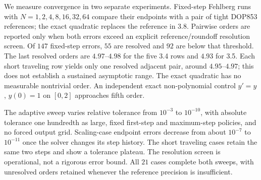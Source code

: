 We measure convergence in two separate experiments.
Fixed-step Fehlberg runs with $N=1,2,4,8,16,32,64$ compare their endpoints
with a pair of tight DOP853 references; the exact quadratic replaces the
reference in 3.8. Pairwise orders are reported only when both errors exceed
an explicit reference/roundoff resolution screen. Of $147$ fixed-step errors,
$55$ are resolved and $92$ are below that threshold. The last resolved orders
are $4.97$--$4.98$ for the five 3.4 rows and $4.93$ for 3.5. Each short
traveling row yields only one resolved adjacent pair, around $4.95$--$4.97$;
this does not establish a sustained asymptotic range. The exact quadratic
has no measurable nontrivial order. An independent exact non-polynomial
control $y'=y$, $y(0)=1$ on $[0,2]$ approaches fifth order.

The adaptive sweep varies relative tolerance from $10^{-3}$ to $10^{-10}$,
with absolute tolerance one hundredth as large, fixed first-step and
maximum-step policies, and no forced output grid. Scaling-case endpoint
errors decrease from about $10^{-7}$ to $10^{-11}$ once the solver changes
its step history. The short traveling cases retain the same two steps and
show a tolerance plateau. The resolution screen is operational, not a
rigorous error bound. All $21$ cases complete both sweeps, with unresolved
orders retained whenever the reference precision is insufficient.



